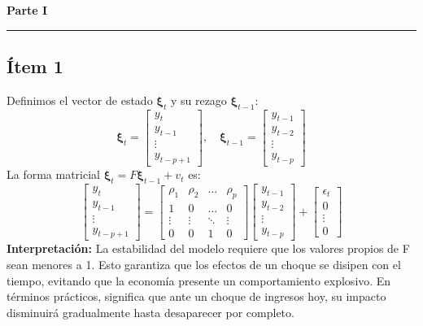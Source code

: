 \begin{center}
    {\LARGE \textbf{Parte I}}\\[6pt]
\end{center}
\vspace{4pt}\hrule\vspace{10pt}

\subsection*{Ítem 1 }
Definimos el vector de estado $\bm{\xi}_t$ y su rezago $\bm{\xi}_{t-1}$:
\begin{equation}
    \bm{\xi}_t = \begin{bmatrix} y_t \\ y_{t-1} \\ \vdots \\ y_{t-p+1} \end{bmatrix}, \quad \bm{\xi}_{t-1} = \begin{bmatrix} y_{t-1} \\ y_{t-2} \\ \vdots \\ y_{t-p} \end{bmatrix}
\end{equation}
La forma matricial $\bm{\xi}_t = F \bm{\xi}_{t-1} + v_t$ es:
\begin{equation}
    \begin{bmatrix} y_t \\ y_{t-1} \\ \vdots \\ y_{t-p+1} \end{bmatrix} = \begin{bmatrix} 
    \rho_1 & \rho_2 & \dots & \rho_p \\
    1 & 0 & \dots & 0 \\
    \vdots & \vdots & \ddots & \vdots \\
    0 & 0 & 1 & 0
    \end{bmatrix} \begin{bmatrix} y_{t-1} \\ y_{t-2} \\ \vdots \\ y_{t-p} \end{bmatrix} + \begin{bmatrix} \epsilon_t \\ 0 \\ \vdots \\ 0 \end{bmatrix}
\end{equation}
\textbf{Interpretación:} La estabilidad del modelo requiere que los valores propios de F sean menores a 1. Esto garantiza que los efectos de un choque se disipen con el tiempo, evitando que la economía presente un comportamiento explosivo. En términos prácticos, significa que ante un choque de ingresos hoy, su impacto disminuirá gradualmente hasta desaparecer por completo.

